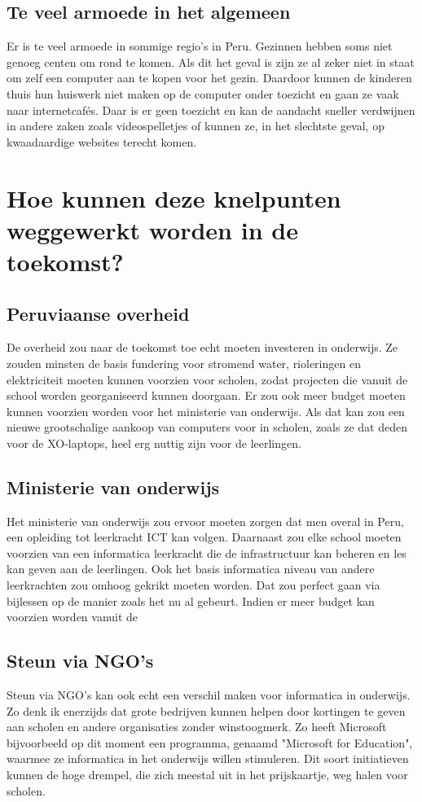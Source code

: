 \subsection{Te veel armoede in het algemeen}
Er is te veel armoede in sommige regio's in Peru. Gezinnen hebben soms niet genoeg centen om rond te komen. Als dit het geval is zijn ze al zeker niet in staat om zelf een computer aan te kopen voor het gezin. Daardoor kunnen de kinderen thuis hun huiswerk niet maken op de computer onder toezicht en gaan ze vaak naar internetcafés. Daar is er geen toezicht en kan de aandacht sneller verdwijnen in andere zaken zoals videospelletjes of kunnen ze, in het slechtste geval, op kwaadaardige websites terecht komen.

\section{Hoe kunnen deze knelpunten weggewerkt worden in de toekomst?}

\subsection{Peruviaanse overheid}
De overheid zou naar de toekomst toe echt moeten investeren in onderwijs. Ze zouden minsten de basis fundering voor stromend water, rioleringen en elektriciteit moeten kunnen voorzien voor scholen, zodat projecten die vanuit de school worden georganiseerd kunnen doorgaan. Er zou ook meer budget moeten kunnen voorzien worden voor het ministerie van onderwijs. Als dat kan zou een nieuwe grootschalige aankoop van computers voor in scholen, zoals ze dat deden voor de XO-laptops, heel erg nuttig zijn voor de leerlingen. 

\subsection{Ministerie van onderwijs}
Het ministerie van onderwijs zou ervoor moeten zorgen dat men overal in Peru, een opleiding tot leerkracht ICT kan volgen. Daarnaast zou elke school moeten voorzien van een informatica leerkracht die de infrastructuur kan beheren en les kan geven aan de leerlingen. Ook het basis informatica niveau van andere leerkrachten zou omhoog gekrikt moeten worden. Dat zou perfect gaan via bijlessen op de manier zoals het nu al gebeurt. Indien er meer budget kan voorzien worden vanuit de 

\subsection{Steun via NGO's}
Steun via NGO's kan ook echt een verschil maken voor informatica in onderwijs. Zo denk ik enerzijds dat grote bedrijven kunnen helpen door kortingen te geven aan scholen en andere organisaties zonder winstoogmerk. Zo heeft Microsoft bijvoorbeeld op dit moment een programma, genaamd "Microsoft for Education", waarmee ze informatica in het onderwijs willen stimuleren. Dit soort initiatieven kunnen de hoge drempel, die zich meestal uit in het prijskaartje, weg halen voor scholen. 

